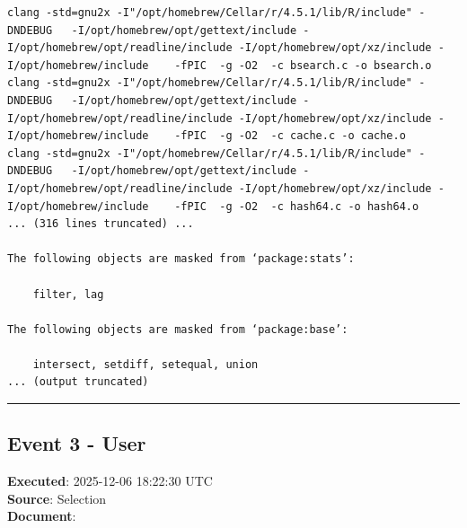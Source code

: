 \documentclass[
  11pt,
]{article}
\newenvironment{rpoutput}{\vspace{0.5em}\begin{snugshade}}{\end{snugshade}}
\begin{document}
\begin{rpoutput}
\begin{verbatim}
clang -std=gnu2x -I"/opt/homebrew/Cellar/r/4.5.1/lib/R/include" -DNDEBUG   -I/opt/homebrew/opt/gettext/include -I/opt/homebrew/opt/readline/include -I/opt/homebrew/opt/xz/include -I/opt/homebrew/include    -fPIC  -g -O2  -c bsearch.c -o bsearch.o
clang -std=gnu2x -I"/opt/homebrew/Cellar/r/4.5.1/lib/R/include" -DNDEBUG   -I/opt/homebrew/opt/gettext/include -I/opt/homebrew/opt/readline/include -I/opt/homebrew/opt/xz/include -I/opt/homebrew/include    -fPIC  -g -O2  -c cache.c -o cache.o
clang -std=gnu2x -I"/opt/homebrew/Cellar/r/4.5.1/lib/R/include" -DNDEBUG   -I/opt/homebrew/opt/gettext/include -I/opt/homebrew/opt/readline/include -I/opt/homebrew/opt/xz/include -I/opt/homebrew/include    -fPIC  -g -O2  -c hash64.c -o hash64.o
... (316 lines truncated) ...

The following objects are masked from ‘package:stats’:

    filter, lag

The following objects are masked from ‘package:base’:

    intersect, setdiff, setequal, union
... (output truncated)
\end{verbatim}

\end{rpoutput}

\begin{center}\rule{0.5\linewidth}{0.5pt}\end{center}

\subsection{Event 3 - User}\label{event-3---user}

\textbf{Executed}: 2025-12-06 18:22:30 UTC\\
\textbf{Source}: Selection\\
\textbf{Document}:
\end{document}
